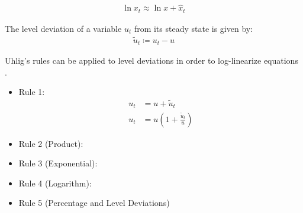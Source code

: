 \documentclass[../thesis.tex]{subfiles}
\begin{document}
\begin{corollary}\label{coro:logarithm-rule}
	
	\begin{align*}
		\ln x_t \approx \ln x + \hat{x}_t
	\end{align*}
	
\end{corollary}


\begin{definition}\label{def:level-deviation}
	
	The level deviation of a variable $u_t$ from its steady state is given by: \cite[Lecture 9, p.9]{solis-garcia_ucb_2022}
	\begin{align}
		\widetilde{u}_t \coloneq u_t - u \label{eq:level-deviation}
	\end{align}
	
\end{definition}


\begin{lemma}\label{lemma:level-rules}
	
	Uhlig's rules can be applied to level deviations in order to log-linearize equations \cite[Lecture 9, p.9]{solis-garcia_ucb_2022}.
	
	\begin{itemize}
		\item Rule 1:
		\begin{align}
			\label{lemma:level-rule-1a}
			u_t &= u + \widetilde{u}_t \\
			\label{lemma:level-rule-1b}
			u_t &= u\left(1+ \frac{\widetilde{u}_t}{u} \right)
		\end{align}
		
		\item Rule 2 (Product):
		
		\item Rule 3 (Exponential):
		
		\item Rule 4 (Logarithm):
		
		\item Rule 5 (Percentage and Level Deviations)
		
	\end{itemize}
	
\end{lemma}
\end{document}
